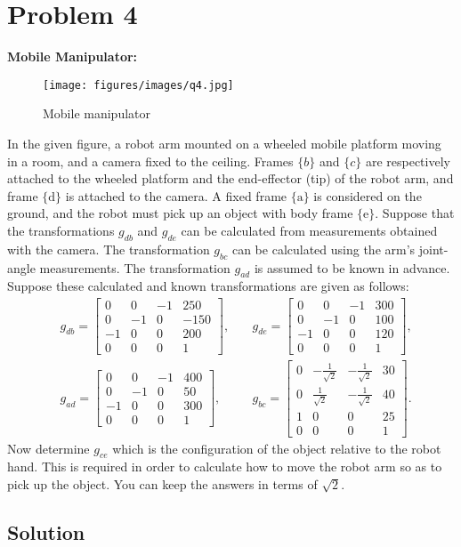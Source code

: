 \section*{Problem 4}

\textbf{Mobile Manipulator:}

\begin{figure}[h]
    \centering
    \texttt{[image: figures/images/q4.jpg]}
    \caption{
        Mobile manipulator
    }\label{fig:q4}
\end{figure}

In the given figure, a robot arm mounted on a wheeled mobile platform moving in a room, and a camera fixed to the ceiling.
Frames \( \{b\} \) and \( \{c\} \) are respectively attached to the wheeled platform and the end-effector (tip) of the robot arm, and frame \( \{\mathrm{d}\} \) is attached to the camera.
A fixed frame \( \{\mathrm{a}\} \) is considered on the ground, and the robot must pick up an object with body frame \( \{\mathrm{e}\} \).
Suppose that the transformations \( g_{d b} \) and \( g_{d e} \) can be calculated from measurements obtained with the camera.
The transformation \( g_{b c} \) can be calculated using the arm's joint-angle measurements.
The transformation \( g_{a d} \) is assumed to be known in advance.
Suppose these calculated and known transformations are given as follows:
\begin{align*}
     &
    g_{d b}
    =
    \begin{bmatrix}
        0  & 0  & -1 & 250  \\
        0  & -1 & 0  & -150 \\
        -1 & 0  & 0  & 200  \\
        0  & 0  & 0  & 1
    \end{bmatrix}
    , \quad
     &
    g_{d e}
    =
    \begin{bmatrix}
        0  & 0  & -1 & 300 \\
        0  & -1 & 0  & 100 \\
        -1 & 0  & 0  & 120 \\
        0  & 0  & 0  & 1
    \end{bmatrix},
    \\ &
    g_{a d}
    =
    \begin{bmatrix}
        0  & 0  & -1 & 400 \\
        0  & -1 & 0  & 50  \\
        -1 & 0  & 0  & 300 \\
        0  & 0  & 0  & 1
    \end{bmatrix}
    , \quad
     &
    g_{b c}
    =
    \begin{bmatrix}
        0 & -\frac{1}{\sqrt{2}} & -\frac{1}{\sqrt{2}} & 30 \\
        0 & \frac{1}{\sqrt{2}}  & -\frac{1}{\sqrt{2}} & 40 \\
        1 & 0                   & 0                   & 25 \\
        0 & 0                   & 0                   & 1
    \end{bmatrix}
    .
\end{align*}
Now determine \( g_{c e} \) which is the configuration of the object relative to the robot hand.
This is required in order to calculate how to move the robot arm so as to pick up the object.
You can keep the answers in terms of \( \sqrt{2} \).

\subsection*{Solution}
